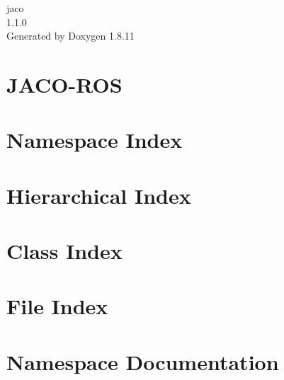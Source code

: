 \documentclass[twoside]{book}
\newcommand{\+}{\discretionary{\mbox{\scriptsize$\hookleftarrow$}}{}{}}
\newcommand{\clearemptydoublepage}{%
  \newpage{\pagestyle{empty}\cleardoublepage}%
}
\begin{document}
\hypersetup{pageanchor=false,
             bookmarksnumbered=true,
             pdfencoding=unicode
            }
\begin{titlepage}
\vspace*{7cm}
\begin{center}%
{\Large jaco \\[1ex]\large 1.\+1.\+0 }\\
\vspace*{1cm}
{\large Generated by Doxygen 1.8.11}\\
\end{center}
\end{titlepage}
\clearemptydoublepage
\tableofcontents
\clearemptydoublepage
{}
\hypersetup{pageanchor=true}

\chapter{J\+A\+C\+O-\/\+R\+OS}
\label{md_C:_Users_soli_Downloads_New_folder_kinova-ros-master_README}
\hypertarget{md_C:_Users_soli_Downloads_New_folder_kinova-ros-master_README}{}

\chapter{Namespace Index}

\chapter{Hierarchical Index}

\chapter{Class Index}

\chapter{File Index}

\chapter{Namespace Documentation}











\end{document}
